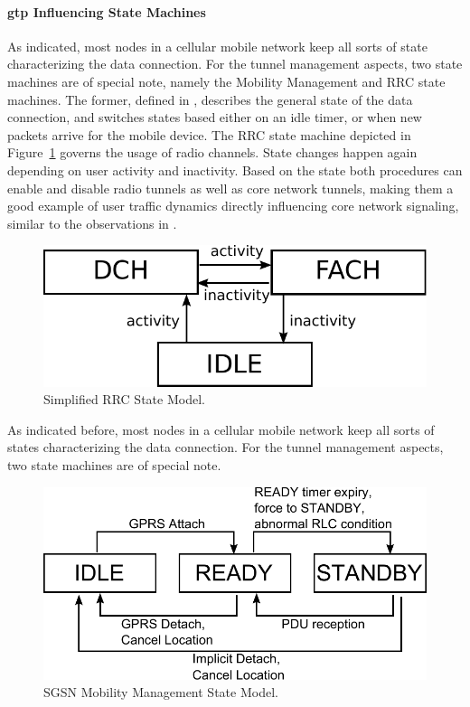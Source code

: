 \paragraph{\texorpdfstring{\acrshort{gtp}}{GTP} Influencing State Machines}

As indicated, most nodes in a cellular mobile network keep all sorts of state characterizing the data connection. For the tunnel management aspects, two state machines are of special note, namely the Mobility Management and \gls{RRC} state machines.
The former, defined in \cite{3gpp.23.060}, describes the general state of the data connection, and switches states based either on an idle timer, or when new packets arrive for the mobile device. The \gls{RRC} state machine depicted in Figure~\ref{c4:fig:rrcstatemodel} governs the usage of radio channels. State changes happen again depending on user activity and inactivity.
Based on the state both procedures can enable and disable radio tunnels as well as core network tunnels, making them a good example of user traffic dynamics directly influencing core network signaling, similar to the observations in \cite{lee2007detection}.

\begin{figure}[htb]
	\centering
	\includegraphics[width=0.8\columnwidth]{images/rrc-simplified-state-model.pdf}
	\caption{Simplified \gls{RRC} State Model.}
	\label{c4:fig:rrcstatemodel}
\end{figure}


As indicated before, most nodes in a cellular mobile network keep all sorts of states characterizing the data connection. For the tunnel management aspects, two state machines are of special note.

\begin{figure}[htb]
	\centering
	\includegraphics[width=0.8\columnwidth]{images/mm-state-model.pdf}
	\caption{\gls{SGSN} Mobility Management State Model.}
	\label{c4:fig:mmstatemodel}
\end{figure}

